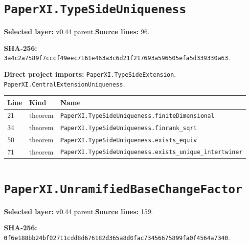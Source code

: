 \documentclass[10pt,oneside]{book}
\begin{document}
\section{\texorpdfstring{\nolinkurl{PaperXI.TypeSideUniqueness}}{PaperXI.TypeSideUniqueness}}\label{module:PaperXI.TypeSideUniqueness}

\textbf{Selected layer:} v0.44 parent.\quad\textbf{Source lines:} 96.\par\textbf{SHA-256:} {\scriptsize\nolinkurl{3a4c2a7589f7cccf49eec7161e463a3c6d21f217693a596505efa5d339330a63}}.


\textbf{Direct project imports:} \nolinkurl{PaperXI.TypeSideExtension}, \nolinkurl{PaperXI.CentralExtensionUniqueness}.

\begin{longtable}{@{}p{}p{}p{}@{}}\toprule Line&Kind&Name\\\midrule\endhead

21&theorem&\nolinkurl{PaperXI.TypeSideUniqueness.finiteDimensional}\\

34&theorem&\nolinkurl{PaperXI.TypeSideUniqueness.finrank_sqrt}\\

50&theorem&\nolinkurl{PaperXI.TypeSideUniqueness.exists_equiv}\\

71&theorem&\nolinkurl{PaperXI.TypeSideUniqueness.exists_unique_intertwiner}\\

\bottomrule\end{longtable}

\section{\texorpdfstring{\nolinkurl{PaperXI.UnramifiedBaseChangeFactor}}{PaperXI.UnramifiedBaseChangeFactor}}\label{module:PaperXI.UnramifiedBaseChangeFactor}

\textbf{Selected layer:} v0.44 parent.\quad\textbf{Source lines:} 159.\par\textbf{SHA-256:} {\scriptsize\nolinkurl{0f6e188bb24bf02711cdd8d676182d365a8d0fac73456675899fa0f4564a7340}}.

\end{document}
